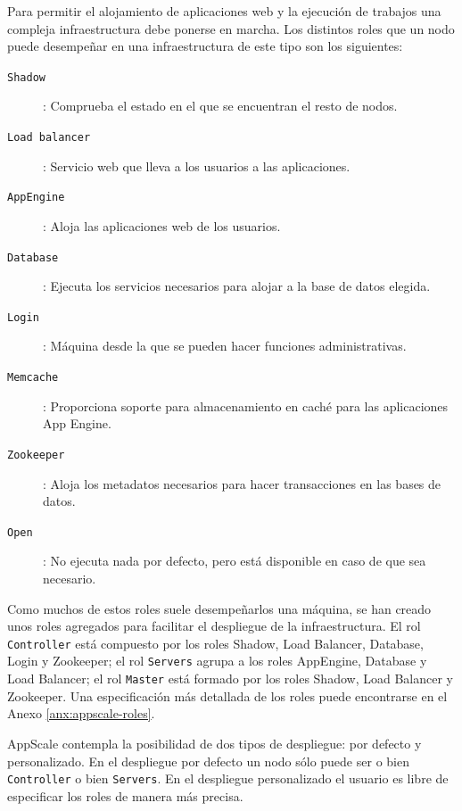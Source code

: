 Para permitir el alojamiento de aplicaciones web y la ejecución de trabajos una compleja infraestructura debe ponerse en marcha. Los distintos roles que un nodo puede desempeñar en una infraestructura de este tipo son los siguientes:

\begin{description}
\item[\texttt{Shadow}]: Comprueba el estado en el que se encuentran el resto de nodos.
\item[\texttt{Load balancer}]: Servicio web que lleva a los usuarios a las aplicaciones.
\item[\texttt{AppEngine}]: Aloja las aplicaciones web de los usuarios.
\item[\texttt{Database}]: Ejecuta los servicios necesarios para alojar a la base de datos elegida.
\item[\texttt{Login}]: Máquina desde la que se pueden hacer funciones administrativas.
\item[\texttt{Memcache}]: Proporciona soporte para almacenamiento en caché para las aplicaciones App Engine.
\item[\texttt{Zookeeper}]: Aloja los metadatos necesarios para hacer transacciones en las bases de datos.
\item[\texttt{Open}]: No ejecuta nada por defecto, pero está disponible en caso de que sea necesario.
\end{description}

Como muchos de estos roles suele desempeñarlos una máquina, se han creado unos roles agregados para facilitar el despliegue de la infraestructura. El rol \texttt{Controller} está compuesto por los roles Shadow, Load Balancer, Database, Login y Zookeeper; el rol \texttt{Servers} agrupa a los roles AppEngine, Database y Load Balancer; el rol \texttt{Master} está formado por los roles Shadow, Load Balancer y Zookeeper. Una especificación más detallada de los roles puede encontrarse en el Anexo \ref{anx:appscale-roles}.

AppScale contempla la posibilidad de dos tipos de despliegue: por defecto y personalizado. En el despliegue por defecto un nodo sólo puede ser o bien \texttt{Controller} o bien \texttt{Servers}. En el despliegue personalizado el usuario es libre de especificar los roles de manera más precisa. \\

